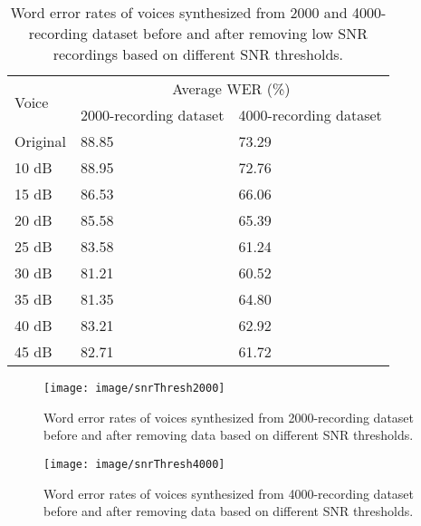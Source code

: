\documentclass[12pt]{article}
\begin{document}
\begin{table}[]
\begin{center}
\caption{Word error rates of voices synthesized from 2000 and 4000-recording dataset before and after removing low SNR recordings based on different SNR thresholds.}
\label{tab_werSnrThresh}
\vspace{3mm}
\begin{tabular}{|l|l|l|}
\hline
\multirow{2}{1.7cm}{Voice} &
\multicolumn{2}{c|}{Average WER (\%)} \\ \cline{2-3}
& 2000-recording dataset & 4000-recording dataset \\
\hline
Original & 88.85 & 73.29\\
10 dB    & 88.95 & 72.76\\
15 dB    & 86.53 & 66.06\\
20 dB    & 85.58 & 65.39\\
25 dB    & 83.58 & 61.24\\
30 dB    & 81.21 & 60.52\\
35 dB    & 81.35 & 64.80\\
40 dB    & 83.21 & 62.92\\
45 dB    & 82.71 & 61.72\\
\hline
\end{tabular}
\end{center}
\end{table}

\begin{figure}[t]
\begin{center}
\texttt{[image: image/snrThresh2000]}
\end{center}
\vspace{-0.3cm}
\caption[Word error rates of voices synthesized from 2000-recording dataset before and after removing data based on different SNR thresholds.]{Word error rates of voices synthesized from 2000-recording dataset before and after removing data based on different SNR thresholds.}
\label{fig_snrThresh2000}
\end{figure}

\begin{figure}[t]
\begin{center}
\texttt{[image: image/snrThresh4000]}
\end{center}
\vspace{-0.3cm}
\caption[Word error rates of voices synthesized from 4000-recording dataset before and after removing data based on different SNR thresholds.]{Word error rates of voices synthesized from 4000-recording dataset before and after removing data based on different SNR thresholds.}
\label{fig_snrThresh4000}
\end{figure}
\end{document}
